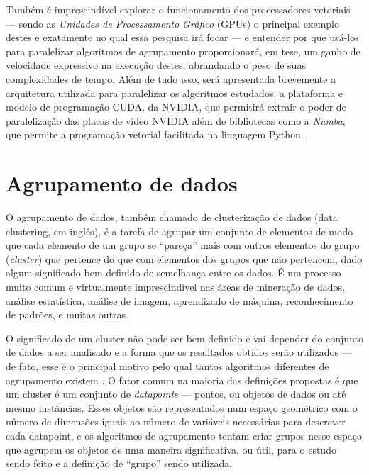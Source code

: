 \documentclass[12pt,
openright, 
oneside, %
a4paper,    %
brazil]{facom-ufu-abntex2}
\begin{document}
Também é imprescindível explorar o funcionamento dos processadores vetoriais --- sendo as \textit{Unidades de Processamento Gráfico} (GPUs) o principal exemplo destes e exatamente no qual essa pesquisa irá focar --- e entender por que usá-los para paralelizar algoritmos de agrupamento proporcionará, em tese, um ganho de velocidade expressivo na execução destes, abrandando o peso de suas complexidades de tempo. Além de tudo isso, será apresentada brevemente a arquitetura utilizada para paralelizar os algoritmos estudados: a plataforma e modelo de programação CUDA, da NVIDIA, que permitirá extrair o poder de paralelização das placas de vídeo NVIDIA além de bibliotecas como a \textit{Numba}, que permite a programação vetorial facilitada na linguagem Python.





\section{Agrupamento de dados}

O agrupamento de dados, também chamado de clusterização de dados (data clustering, em inglês), é a tarefa de agrupar um conjunto de elementos de modo que cada elemento de um grupo se \enquote{pareça} mais com outros elementos do grupo (\textit{cluster}) que pertence do que com elementos dos grupos que não pertencem, dado algum significado bem definido de semelhança entre os dados. É um processo muito comum e virtualmente imprescindível nas áreas de mineração de dados, análise estatística, análise de imagem, aprendizado de máquina, reconhecimento de padrões, e muitas outras.

O significado de um cluster não pode ser bem definido e vai depender do conjunto de dados a ser analisado e a forma que os resultados obtidos serão utilizados --- de fato, esse é o principal motivo pelo qual tantos algoritmos diferentes de agrupamento existem \cite{SoManyClustAlg}. O fator comum na maioria das definições propostas é que um cluster é um conjunto de \textit{datapoints} --- pontos, ou objetos de dados ou até mesmo instâncias. Esses objetos são representados num espaço geométrico com o número de dimensões iguais ao número de variáveis necessárias para descrever cada datapoint, e os algoritmos de agrupamento tentam criar grupos nesse espaço que agrupem os objetos de uma maneira significativa, ou útil, para o estudo sendo feito e a definição de \enquote{grupo} sendo utilizada.
\end{document}
